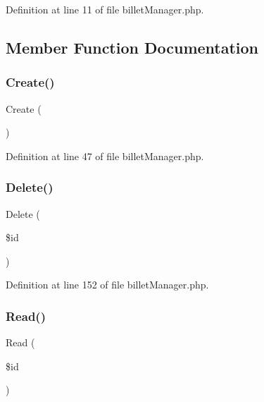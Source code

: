 Definition at line 11 of file billet\+Manager.\+php.



\subsection{Member Function Documentation}
\mbox{\label{class_src_1_1_managers_1_1billet_manager_ad01f71fa0ecc039494e3c282864298c3}} 
\subsubsection{Create()}
{\footnotesize\ttfamily Create (\begin{DoxyParamCaption}{ }\end{DoxyParamCaption})}



Definition at line 47 of file billet\+Manager.\+php.

\mbox{\label{class_src_1_1_managers_1_1billet_manager_a59113b5ecd1d155db6a4f30af34a1e80}} 
\subsubsection{Delete()}
{\footnotesize\ttfamily Delete (\begin{DoxyParamCaption}\item[{}]{\$id }\end{DoxyParamCaption})}



Definition at line 152 of file billet\+Manager.\+php.

\mbox{\label{class_src_1_1_managers_1_1billet_manager_ad2bbc9b3130abdfe3a9fc9e9fe36716f}} 
\subsubsection{Read()}
{\footnotesize\ttfamily Read (\begin{DoxyParamCaption}\item[{}]{\$id }\end{DoxyParamCaption})}



